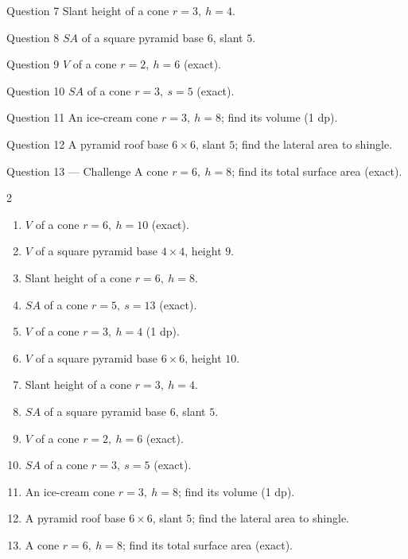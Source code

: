 \documentclass[11pt]{article}
\begin{document}
\begin{qbox}{Question 7}
Slant height of a cone $r=3,\ h=4$.\workspace{2.0cm}
\end{qbox}

\begin{qbox}{Question 8}
$SA$ of a square pyramid base $6$, slant $5$.\workspace{2.2cm}
\end{qbox}

\begin{qbox}{Question 9}
$V$ of a cone $r=2,\ h=6$ (exact).\workspace{2.0cm}
\end{qbox}

\begin{qbox}{Question 10}
$SA$ of a cone $r=3,\ s=5$ (exact).\workspace{2.0cm}
\end{qbox}

\begin{qbox}{Question 11}
An ice-cream cone $r=3,\ h=8$; find its volume (1 dp).\workspace{2.2cm}
\end{qbox}

\begin{qbox}{Question 12}
A pyramid roof base $6\times6$, slant $5$; find the lateral area to shingle.\workspace{2.4cm}
\end{qbox}

\begin{qbox}{Question 13 --- Challenge}
A cone $r=6,\ h=8$; find its total surface area (exact).\workspace{2.6cm}
\end{qbox}

\clearpage
{}

\begin{recapbox}
\begin{multicols}{2}
\small
\begin{enumerate}[leftmargin=*,itemsep=3pt]
  \item $V$ of a cone $r=6,\ h=10$ (exact).
  \item $V$ of a square pyramid base $4\times4$, height $9$.
  \item Slant height of a cone $r=6,\ h=8$.
  \item $SA$ of a cone $r=5,\ s=13$ (exact).
  \item $V$ of a cone $r=3,\ h=4$ (1 dp).
  \item $V$ of a square pyramid base $6\times6$, height $10$.
  \item Slant height of a cone $r=3,\ h=4$.
  \item $SA$ of a square pyramid base $6$, slant $5$.
  \item $V$ of a cone $r=2,\ h=6$ (exact).
  \item $SA$ of a cone $r=3,\ s=5$ (exact).
  \item An ice-cream cone $r=3,\ h=8$; find its volume (1 dp).
  \item A pyramid roof base $6\times6$, slant $5$; find the lateral area to shingle.
  \item A cone $r=6,\ h=8$; find its total surface area (exact).
\end{enumerate}
\end{multicols}
\end{recapbox}
\end{document}
